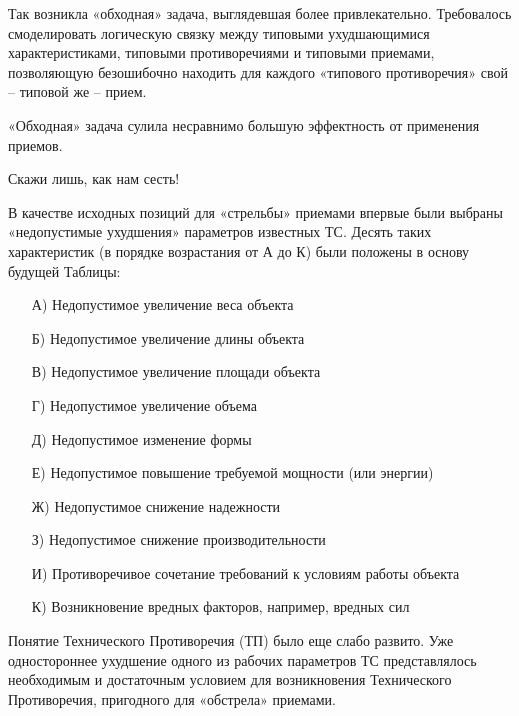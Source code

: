 \documentclass[11pt,a4paper]{article}
\begin{document}
Так возникла «обходная» задача, выглядевшая более привлекательно. Требовалось
смоделировать логическую связку между типовыми ухудшающимися характеристиками,
типовыми противоречиями и типовыми приемами, позволяющую безошибочно находить
для каждого «типового противоречия» свой -- типовой же -- прием.

«Обходная» задача сулила несравнимо большую эффектность от применения приемов.

Скажи лишь, как нам сесть!

В качестве исходных позиций для «стрельбы» приемами впервые были выбраны
«недопустимые ухудшения» параметров известных ТС. Десять таких характеристик
(в порядке возрастания от А до К) были положены в основу будущей Таблицы:
\begin{itemize}
\item[А)] Недопустимое увеличение веса объекта
\item[Б)] Недопустимое увеличение длины объекта
\item[В)] Недопустимое увеличение площади объекта
\item[Г)] Недопустимое увеличение объема
\item[Д)] Недопустимое изменение формы
\item[Е)] Недопустимое повышение требуемой мощности (или энергии)
\item[Ж)] Недопустимое снижение надежности
\item[З)] Недопустимое снижение производительности
\item[И)] Противоречивое сочетание требований к условиям работы объекта
\item[К)] Возникновение вредных факторов, например, вредных сил
\end{itemize}
Понятие Технического Противоречия (ТП) было еще слабо развито. Уже
одностороннее ухудшение одного из рабочих параметров ТС представлялось
необходимым и достаточным условием для возникновения Технического
Противоречия, пригодного для «обстрела» приемами.
\end{document}
